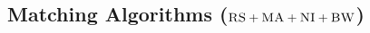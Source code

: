 \documentclass[9pt,twocolumn]{scrartcl}
\newcommand{\VM}{\textsc{VM}}
\newcommand{\Problem}{\textsc{DummyName Problem}}
\newcommand{\carlo}[1]{\textcolor{red}{carlo: #1}}
\newcommand{\ChunkType}{\tau}
\newcommand{\achunk}{\ensuremath{c}}
\newcommand{\CC}{\textsc{NI}}
\newcommand{\RS}{\textsc{RS}}
\newcommand{\BW}{\textsc{BW}}
\newcommand{\MA}{\textsc{MA}}
\begin{document}

\subsection{Matching Algorithms ($\RS+\MA+\CC+\BW$)}
\end{document}
